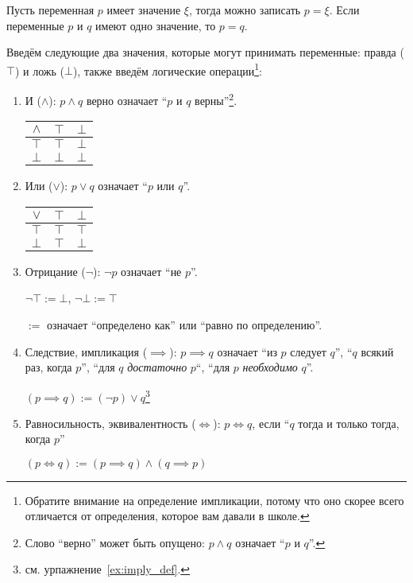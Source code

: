 Пусть переменная $p$ имеет значение $\xi$, тогда можно записать $p=\xi$. Если переменные
$p$ и $q$ имеют одно значение, то $p=q$.

Введём следующие два значения, которые могут принимать
переменные: правда ($\top$) и ложь ($\bot$), также введём логические
операции\footnote{Обратите внимание на определение импликации, потому что оно
	скорее всего отличается от определения, которое вам давали в школе.}:
\begin{enumerate}
	\item{}И ($\land$): $p\land q$ верно означает ``$p$ и $q$
	верны''\footnote{Слово ``верно'' может быть опущено: $p\land q$
		означает ``$p$ и $q$''.}.

	\begin{tabular}{c|cc}
		$\land$ & $\top$ & $\bot$ \\\hline
		$\top$  & $\top$ & $\bot$ \\
		$\bot$  & $\bot$ & $\bot$
	\end{tabular}

	\pagebreak

	\item{}Или ($\lor$): $p\lor q$ означает ``$p$ или $q$''.

	\begin{tabular}{c|cc}
		$\lor$ & $\top$ & $\bot$ \\\hline
		$\top$ & $\top$ & $\top$ \\
		$\bot$ & $\top$ & $\bot$
	\end{tabular}

	\item{} Отрицание ($\lnot$): $\lnot p$ означает ``не $p$''.

	$\lnot\top:=\bot$, $\lnot\bot:=\top$

	$:=$ означает ``определено как'' или ``равно по определению''.

	\item{}Следствие, импликация (${\implies}$): ${p\implies q}$ означает
	``из $p$ следует $q$'', ``$q$ всякий раз, когда $p$'', ``для $q$ {\it достаточно} $p$``,
	``для $p$ {\it необходимо} $q$''.

	$(p\implies q):=(\lnot p)\lor q$\footnote{см. урпажнение~\ref{ex:imply_def}.}

	\item{}Равносильность, эквивалентность (${\iff}$):
	${p\iff q}$, если ``$q$ тогда и только
	тогда, когда $p$''

	$(p\iff q):=(p\implies q)\land (q\implies p)$
\end{enumerate}


